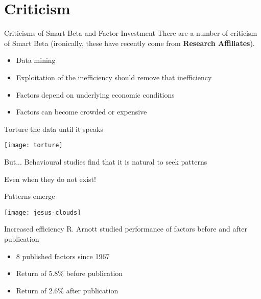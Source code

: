 \documentclass[14pt,xcolor=pdftex,dvipsnames,table]{beamer}\usepackage[]{graphicx}\usepackage[]{color}
\begin{document}
\section{Criticism}
\begin{frame}{Criticisms of Smart Beta and Factor Investment}
There are a number of criticism of Smart Beta (ironically, these have recently 
come from \textbf{Research Affiliates}). 
\begin{itemize}[<+-| alert@+>]
\pause
\item Data mining
\item Exploitation of the inefficiency should remove that inefficiency
\item Factors depend on underlying economic conditions
\item Factors can become crowded or expensive 
\end{itemize}
\end{frame}

\begin{frame}{Torture the data until it speaks}
\begin{center}
\texttt{[image: torture]}
\end{center}
\end{frame}

\begin{frame}{But...}
Behavioural studies find that it is natural to seek patterns
\pause
\vspace{1cm}
\begin{block}{}
Even when they do not exist!
\end{block}
\end{frame}

\begin{frame}{Patterns emerge}
\begin{center}
\texttt{[image: jesus-clouds]}
\end{center}
\end{frame}


\begin{frame}{Increased efficiency}
R. Arnott studied performance of factors before and after publication
\begin{itemize}[<+-| alert@+>]
\pause
\item 8 published factors since 1967
\item Return of 5.8\% before publication
\item Return of 2.6\% after publication
\end{itemize}
\end{frame}
\end{document}
